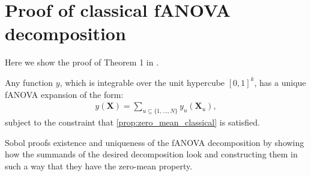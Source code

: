 \section*{Proof of classical fANOVA decomposition}
Here we show the proof of Theorem 1 in \cite{sobol1993sensitivity}.
\begin{theorem}
    Any function $y$, which is integrable over the unit hypercube $[0, 1]^k$, has a unique fANOVA expansion of the form:
    \begin{align*}
        y(\boldsymbol{X}) = \sum_{u \subseteq \{1, \dots, N\}} y_{u}(\boldsymbol{X}_u),
    \end{align*}
    subject to the constraint that \autoref{prop:zero_mean_classical} is satisfied.
\end{theorem}
Sobol proofs existence and uniqueness of the fANOVA decomposition by showing how the summands of the desired decomposition look and constructing them in such a way that they have the zero-mean property.

